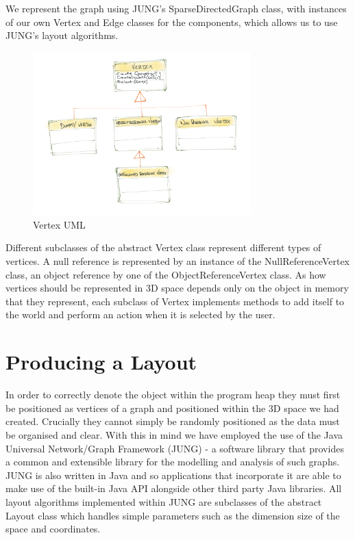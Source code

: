 \documentclass[11pt, a4paper]{report}
\begin{document}
We represent the graph using JUNG’s SparseDirectedGraph class, with instances of our own Vertex and Edge classes for the components, which allows us to use JUNG’s layout algorithms.

\begin{figure}[h]
        \centering
        \includegraphics[width=0.75\textwidth]{images/final/vertex.png}
        \caption{Vertex UML}
\end{figure}

Different subclasses of the abstract Vertex class represent different types of vertices. A null reference is represented by an instance of the NullReferenceVertex class, an object reference by one of the ObjectReferenceVertex class. As how vertices should be represented in 3D space depends only on the object in memory that they represent, each subclass of Vertex implements methods to add itself to the world and perform an action when it is selected by the user.

\section{Producing a Layout}

In order to correctly denote the object within the program heap they must first be positioned as vertices of a graph and positioned within the 3D space we had created. Crucially they cannot simply be randomly positioned as the data must be organised and clear. With this in mind we have employed the use of the Java Universal Network/Graph Framework (JUNG) - a software library that provides a common and extensible library for the modelling and analysis of such graphs. JUNG is also written in Java and so applications that incorporate it are able to make use of the built-in Java API alongside other third party Java libraries. All layout algorithms implemented within JUNG are subclasses of the abstract Layout class which handles simple parameters such as the dimension size of the space and coordinates.
\end{document}
